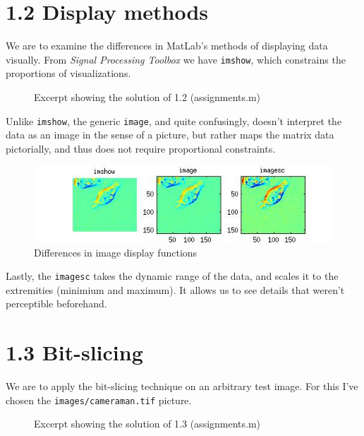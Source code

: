 \documentclass[11pt]{article}
\newcommand{\code}[1]{{\tt #1}}
\newcommand{\file}[1]{{\tt #1}}
\newcommand{\codefig}[5]
{
\begin{figure}[H]
    
    \caption{#5 (#2)}
    \label{code:#1}
\end{figure}
}
\begin{document}
\section{1.2 \mdseries Display methods}
\label{sec:1-2}
We are to examine the differences in MatLab's methods of displaying
data visually. From {\it Signal Processing Toolbox} we have \code{imshow},
which constrains the proportions of visualizations.

\codefig{1-2}{assignments.m}{21}{28}{Excerpt showing the solution of 1.2}

Unlike \code{imshow}, the generic \code{image}, and quite confusingly, doesn't
interpret the data as an image in the sense of a picture, but rather maps the
matrix data pictorially, and thus does not require proportional constraints.

\begin{figure}[H]
    \center
    \includegraphics[scale=0.75]{figures/1-2.jpg}
    \caption{Differences in image display functions}
\end{figure}

Lastly, the \code{imagesc} takes the dynamic range of the data, and scales it
to the extremities (minimium and maximum). It allows us to see details that
weren't perceptible beforehand.


\section{1.3 \mdseries Bit-slicing}
\label{sec:1-3}
We are to apply the bit-slicing technique on an arbitrary test image. For this
I've chosen the \file{images/cameraman.tif} picture.

\codefig{1-3}{assignments.m}{30}{38}{Excerpt showing the solution of 1.3}
\end{document}
